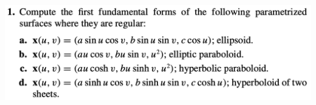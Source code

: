 \documentclass{report}
\begin{document}
\begin{question}{}{}
\includegraphics[height=10cm,width=18cm]{hw4q8}
\end{question}
\end{document}
